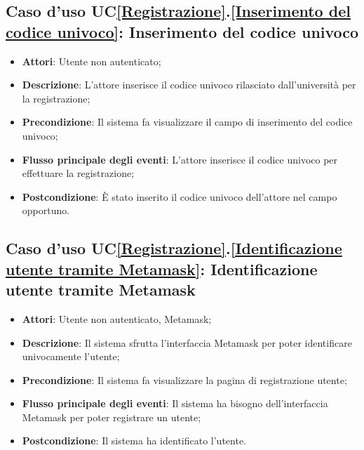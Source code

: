 \subsection{Caso d'uso UC\ref{Registrazione}.\ref{Inserimento del codice univoco}: Inserimento del codice univoco}
\begin{itemize}
	\item \textbf{Attori}: Utente non autenticato;
	\item \textbf{Descrizione}: L'attore inserisce il codice univoco rilasciato dall'università per la registrazione;
	\item \textbf{Precondizione}: Il sistema fa visualizzare il campo di inserimento del codice univoco;
	\item \textbf{Flusso principale degli eventi}: L'attore inserisce il codice univoco per effettuare la registrazione;
	\item \textbf{Postcondizione}: È stato inserito il codice univoco dell'attore nel campo opportuno.
\end{itemize}

\subsection{Caso d'uso UC\ref{Registrazione}.\ref{Identificazione utente tramite Metamask}: Identificazione utente tramite Metamask}
\begin{itemize}
	\item \textbf{Attori}: Utente non autenticato, Metamask;
	\item \textbf{Descrizione}: Il sistema sfrutta l'interfaccia Metamask per poter identificare univocamente l'utente;
	\item \textbf{Precondizione}: Il sistema fa visualizzare la pagina di registrazione utente;
	\item \textbf{Flusso principale degli eventi}: Il sistema ha bisogno dell'interfaccia Metamask per poter registrare un utente;
	\item \textbf{Postcondizione}: Il sistema ha identificato l'utente.
\end{itemize}

